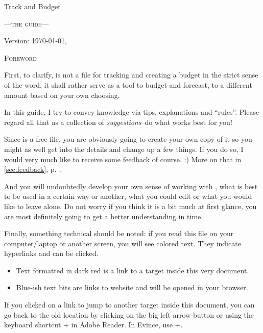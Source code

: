 
\begin{center}\LARGE
Track and Budget
\end{center}
\begin{center}\scshape\large\sffamily
	---the guide---
\end{center}

\vfill
\begin{center}
Version: \today, \thistime
\end{center}

\clearpage
\begin{center}\large\scshape
	Foreword
\end{center}
First, to clarify, \tfn is not a file for tracking and creating a budget in the strict sense of the word, it shall rather serve as a tool to budget and forecast, to a different amount based on your own choosing.

In this guide, I try to convey knowledge via tips, explanations and ``rules''.
Please regard all that as a collection of \emph{suggestions}--do what works best for you!

Since \tfn is a free file, you are obviously going to create your own copy of it so you might as well get into the details and change up a few things.
If you do so, I would very much like to receive some feedback of course. :)
More on that in \autoref{sec:feedback}, p.~\pageref{sec:feedback}.

And you will undoubtedly develop your own sense of working with \tfn, what is best to be used in a certain way or another, what you could edit or what you would like to leave alone.
Do not worry if you think it is a bit much at first glance, you are most definitely going to get a better understanding in time.

Finally, something technical should be noted: if you read this file on your computer/laptop or another screen, you will see colored text.
They indicate hyperlinks and can be clicked.
\begin{itemize}
	\item Text formatted in dark red is a link to a target inside this very document.
	\item Blue-ish text bits are links to website and will be opened in your browser.
\end{itemize}
If you clicked on a link to jump to another target inside this document, you can go back to the old location by clicking on the big left arrow-button or using the keyboard shortcut +\keystroke{\( \leftarrow \)}  in Adobe Reader.
In Evince, use +.
